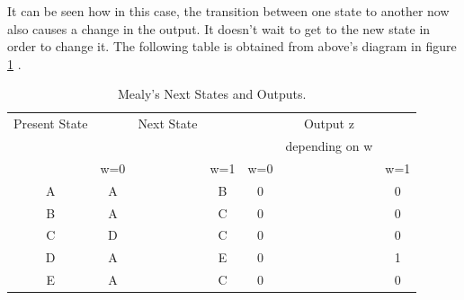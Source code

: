 It can be seen how in this case, the transition between one state to another now also causes a change in the output. It doesn't wait to get to the new state in order to change it. The following table is obtained from above's diagram in figure \ref {measej2} .
\begin{table}[H]
\begin{center}
\begin{tabular}{|c|c c c|c c c|}
\hline
Present State & & Next State & & & Output z & \\
 &  & & & & depending on w&  \\
 & w=0 & & w=1 & w=0& &w=1  \\
\hline
\hline
A & A & & B & 0 & & 0   \\
\hline
B & A & & C & 0 & & 0   \\
\hline
C & D & & C & 0 & & 0 \\
\hline
D & A & & E & 0 & & 1  \\
\hline
E & A & & C & 0 & & 0 \\
\hline
\hline
\end{tabular}
\end{center}
\caption{\label{measej2}\color{cyan}Mealy's Next States and Outputs.}
\end{table}
